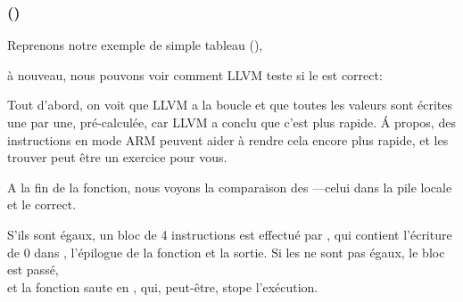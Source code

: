 \subsubsection{\OptimizingXcodeIV (\ThumbTwoMode)}

Reprenons notre exemple de simple tableau (),

à nouveau, nous pouvons voir comment LLVM teste si le  est correct:




Tout d'abord, on voit que LLVM a  la boucle et que toutes les valeurs
sont écrites une par une, pré-calculée, car LLVM a conclu que c'est plus rapide.
Á propos, des instructions en mode ARM peuvent aider à rendre cela encore plus rapide,
et les trouver peut être un exercice pour vous.

A la fin de la fonction, nous voyons la comparaison des ---celui dans
la pile locale et le correct.

S'ils sont égaux, un bloc de 4 instructions est effectué par , qui
contient l'écriture de 0 dans , l'épilogue de la fonction et la sortie.
Si les  ne sont pas égaux, le bloc est passé,\\
et la fonction saute en , qui, peut-être, stope l'exécution.
